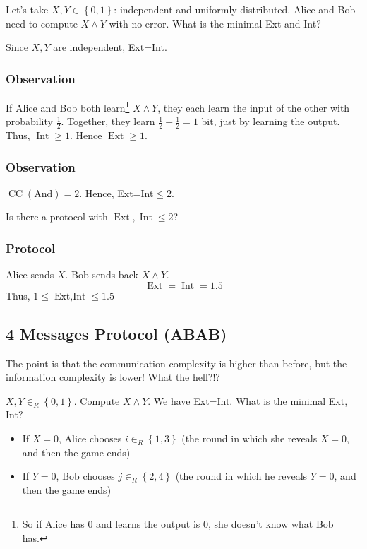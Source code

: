\documentclass{article}
\begin{document}
Let's take $X,Y\in\left\{0,1\right\}$: independent and uniformly distributed. Alice and Bob need to compute $X\wedge Y$ with no error. What is the minimal Ext and Int?

Since $X,Y$ are independent, Ext=Int.

\subsubsection{Observation}

If Alice and Bob both learn\footnote{So if Alice has $0$ and learns the output is $0$, she doesn't know what Bob has.} $X\wedge Y$, they each learn the input of the other with probability $\frac{1}{2}$. Together, they learn $\frac{1}{2}+\frac{1}{2}=1$ bit, just by learning the output. Thus, $\operatorname{Int}\geq 1$. Hence $\operatorname{Ext}\geq 1$.

\subsubsection{Observation}

$\operatorname{CC}\left(\text{And}\right)=2$. Hence, Ext=Int$\leq 2$.

Is there a protocol with $\operatorname{Ext},\operatorname{Int}\leq 2$?

\subsubsection{Protocol}

Alice sends $X$. Bob sends back $X\wedge Y$. 
\[
\operatorname{Ext}=\operatorname{Int}=1.5
\]
Thus, $1\leq \operatorname{Ext,Int}\leq 1.5$

\subsection{4 Messages Protocol (ABAB)}

The point is that the communication complexity is higher than before, but the information complexity is lower! What the hell?!?

$X,Y\in_R \left\{0,1\right\}$. Compute $X\wedge Y$. We have Ext=Int. What is the minimal Ext, Int?

\begin{itemize}
    \item If $X=0$, Alice chooses $i\in_R \left\{1,3\right\}$ (the round in which she reveals $X=0$, and then the game ends)
    \item If $Y=0$, Bob chooses $j\in_R \left\{2,4\right\}$ (the round in which he reveals $Y=0$, and then the game ends)
\end{itemize}
\end{document}
